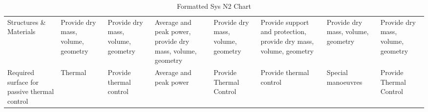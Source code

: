 



% 

\begin{small}
\begin{longtable}[H]{C{\tabcolsep} C{\tabcolsep} C{\tabcolsep} C{\tabcolsep} C{\tabcolsep} C{\tabcolsep} C{\tabcolsep} C{\tabcolsep} }
\caption{Formatted Sys N2 Chart}\label{tab:FormattedS}\\ 
\toprule
                                                    Structures \& Materials &                                             Provide dry mass, volume, geometry &                               Provide dry mass, volume, geometry &   Average and peak power, provide dry mass, volume, geometry &   Provide dry mass, volume, geometry &   Provide support and protection, provide dry mass, volume, geometry &                                       Provide dry mass, volume, geometry &                       Provide dry mass, volume, geometry \\
\addlinespace[\tableskip]
                               Required surface for passive thermal control &                                                                        Thermal &                                          Provide thermal control &                                       Average and peak power &              Provide Thermal Control &                                              Provide thermal control &                                                       Special manoeuvres &                                  Provide Thermal Control \\

\end{longtable}
\end{small}
